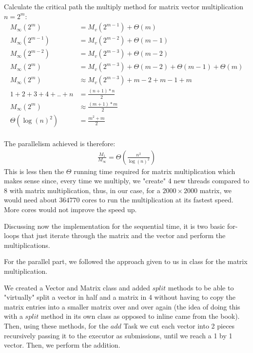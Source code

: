\documentclass[11pt,letterpaper]{exam}
\begin{document}
\begin{questions}
\begin{parts}
\begin{subparts}
							\newpage
							Calculate the critical path the multiply method for matrix vector multiplication $n = 2^m$:
							\begin{align*}
								M_\infty(2^m) &= M_v(2^{m-1}) + \Theta(m)\\
								M_\infty(2^{m-1}) &= M_v(2^{m-2}) + \Theta(m-1)\\
								M_\infty(2^{m-2}) &= M_v(2^{m-3}) + \Theta(m-2)\\
								M_\infty(2^m) &=  M_v(2^{m-3}) + \Theta(m-2) + \Theta(m-1) + \Theta(m)\\
								M_\infty(2^m) &\approx M_v(2^{m-3}) + m-2 + m-1 + m\\
								1+2+3+4+..+n &= \frac{(n+1)*n}{2}\\
								M_\infty(2^m) &\approx \frac{(m+1)*m}{2} \\
								\Theta(\log(n)^2) &= \frac{m^2+m}{2}\\								
							\end{align*}
							
							\subpart
								The parallelism achieved is therefore: 
								\begin{align*}
									\frac{M_1}{M_\infty} = \Theta(\frac{n^2}{\log(n)^2})
								\end{align*}
								This is less then the $\Theta$ running time required for matrix multiplication which makes sense since, every time we multiply, we "create" 4 new threads compared to 8 with matrix multiplication, thus, in our case, for a $2000 \times 2000$ matrix, we would need about $364770$ cores to run the multiplication at its fastest speed. More cores would not improve the speed up.
								
								\quad Discussing now the implementation for the sequential time, it is two basic for-loops that just iterate through the matrix and the vector and perform the multiplications.
								
								For the parallel part, we followed the approach given to us in class for the matrix multiplication. 
								
								\quad We created a Vector and Matrix class and added $split$ methods to be able to "virtually" split a vector in half and a matrix in 4 without having to copy the matrix entries into a smaller matrix over and over again (the idea of doing this with a $split$ method in its own class as opposed to inline came from the book). Then, using these methods, for the $add$ Task we cut each vector into 2 pieces recursively passing it to the executor as submissions, until we reach a 1 by 1 vector. Then, we perform the addition. 
								

\end{subparts}
\end{parts}
\end{questions}
\end{document}
